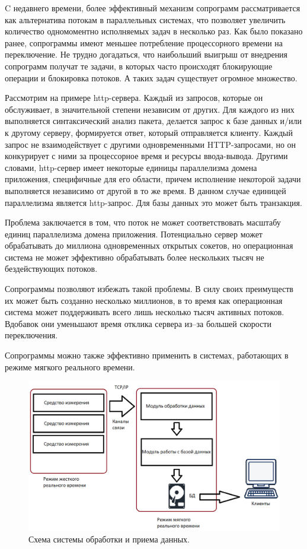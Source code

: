 	C недавнего времени, более эффективный механизм сопрограмм рассматривается
	как альтернатива потокам в параллельных системах, что позволяет увеличить количество одномоментно 
	исполняемых задач в несколько раз. Как было показано ранее, сопрограммы имеют меньшее
	потребление процессорного времени на переключение. Не трудно догадаться, что наибольший
	выигрыш от внедрения сопрограмм получат те задачи, в которых часто происходят блокирующие
	операции и блокировка потоков. А таких задач существует огромное множество.
	\par
	Рассмотрим на примере http-сервера. Каждый из запросов, которые он обслуживает, в значительной
	степени независим от других. Для каждого из них выполняется синтаксический анализ пакета, делается
	запрос к базе данных и/или к другому серверу, формируется ответ, который отправляется клиенту. 
	Каждый запрос не взаимодействует с другими одновременными HTTP-запросами, но он конкурирует
	с ними за процессорное время и ресурсы ввода-вывода.
	Другими словами, http-сервер имеет некоторые единицы параллелизма домена приложения, 
	специфичные для его области, причем исполнение некоторой задачи выполняется независимо от другой в
	то же время. В данном случае единицей параллелизма является http-запрос. Для базы данных это может
	быть транзакция.
	\par
	Проблема заключается в том, что поток не может соответствовать масштабу единиц параллелизма домена приложения.
	Потенциально сервер может обрабатывать до миллиона
	одновременных открытых сокетов, но операционная система не может эффективно обрабатывать более нескольких
	тысяч не бездействующих потоков.
	\par
	Сопрограммы позволяют избежать такой проблемы. В силу своих преимуществ их может быть
	созданно несколько миллионов, в то время как операционная система может поддерживать всего 
	лишь несколько тысяч активных потоков. Вдобавок они уменьшают время отклика сервера из--за
	большей скорости переключения.
	\par
	Сопрограммы можно также эффективно применить в системах, работающих в режиме мягкого
	реального времени.
	\begin{figure}[h]
		\caption{Схема системы  обработки и приема данных.}\label{img-sys}
		\includegraphics[width=0.95\linewidth]{image/system.png}
	\end{figure}
